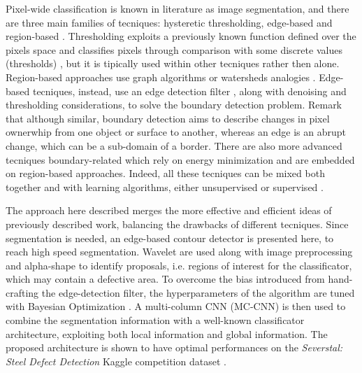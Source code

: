     \par{
        Pixel-wide classification is known in literature as image segmentation, and there are three main families of tecniques: hysteretic thresholding, edge-based and region-based \cite{ieee:7684170}. Thresholding exploits a previously known function defined over the pixels space and classifies pixels through comparison with some discrete values (thresholds) \cite{ieee:4310039}, but it is tipically used within other tecniques rather then alone. Region-based approaches use graph algorithms \cite{ieee:6205760, ieee:868688} or watersheds analogies \cite{ieee:87344}. Edge-based tecniques, instead, use an edge detection filter \cite{Klette:2014:CCV:2584519, googlescholar:kovesiphase, researchgate:phase}, along with denoising and thresholding considerations, to solve the boundary detection problem. Remark that although similar, boundary detection aims to describe changes in pixel ownerwhip from one object or surface to another, whereas an edge is an abrupt change, which can be a sub-domain of a border. There are also more advanced tecniques \cite{springer:Kass1988} boundary-related which rely on energy minimization and are embedded on region-based approaches. Indeed, all these tecniques can be mixed both together and with learning algorithms, either unsupervised \cite{ieee:7684170} or supervised \cite{ieee:1273918}.
    }
    \par{
        The approach here described merges the more effective and efficient ideas of previously described work, balancing the drawbacks of different tecniques. Since segmentation is needed, an edge-based contour detector is presented here, to reach high speed segmentation. Wavelet are used along with image preprocessing and alpha-shape \cite{springer:10.1007/11907350_46} to identify proposals, i.e. regions of interest for the classificator, which may contain a defective area. To overcome the bias introduced from hand-crafting the edge-detection filter, the hyperparameters of the algorithm are tuned with Bayesian Optimization \cite{arXiv:2018arXiv180702811F, arXiv:2012arXiv1206.2944S, rasmussen:williams:2006}.
        A multi-column CNN (MC-CNN) \cite{ieee:6248110} is then used to combine the segmentation information with a well-known classificator architecture, exploiting both local information and global information. The proposed architecture is shown to have optimal performances on the \emph{Severstal: Steel Defect Detection} Kaggle competition dataset \cite{kaggle:severstal}.
    }